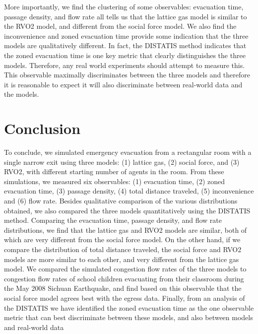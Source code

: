 More importantly, we find the clustering of some observables: evacuation time, passage density, and flow rate all tells us that the lattice gas model is similar to the RVO2 model, and different from the social force model. We also find the inconvenience and zoned evacuation time provide some indication that the three models are qualitatively different. In fact, the DISTATIS method indicates that the zoned evacuation time is one key metric that clearly distinguishes the three models. Therefore, any real world experiments should attempt to measure this. This observable maximally discriminates between the three models and therefore it is reasonable to expect it will also discriminate between real-world data and the models.

\section{Conclusion}\label{Conclusions}

To conclude, we simulated emergency evacuation from a rectangular room with a single narrow exit using three models: (1) lattice gas, (2) social force, and (3) RVO2, with different starting number of agents in the room. From these simulations, we measured six observables: (1) evacuation time, (2) zoned evacuation time, (3) passage density, (4) total distance traveled, (5) inconvenience and (6) flow rate. Besides qualitative comparison of the various distributions obtained, we also compared the three models quantitatively using the DISTATIS method. Comparing the evacuation time, passage density, and flow rate distributions, we find that the lattice gas and RVO2 models are similar, both of which are very different from the social force model. On the other hand, if we compare the distribution of total distance traveled, the social force and RVO2 models are more similar to each other, and very different from the lattice gas model. We compared the simulated congestion flow rates of the three models to congestion flow rates of school children evacuating from their classroom during the May 2008 Sichuan Earthquake, and find based on this observable that the social force model agrees best with the egress data. Finally, from an analysis of the DISTATIS we have identified the zoned evacuation time as the one observable metric that can best discriminate between these models, and also between models and real-world data


